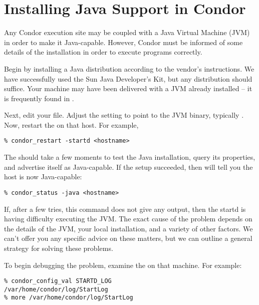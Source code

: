 \section{\label{sec:java-install}Installing Java Support in Condor}


Any Condor execution site may be coupled with a
Java Virtual Machine (JVM) in order to make it Java-capable.
However, Condor must be informed of some details of the
installation in order to execute programs correctly.

Begin by installing a Java distribution according to the vendor's
instructions.  We have successfully used the Sun Java Developer's
Kit, but any distribution should suffice.  Your machine may have
been delivered with a JVM already installed -- it is frequently
found in .

Next, edit your  file.  Adjust the 
setting to point to the JVM binary, typically .
Now, restart the  on that host.  For example,

\begin{verbatim}
% condor_restart -startd <hostname>
\end{verbatim}

The  should take a few moments to test the Java
installation, query its properties, and advertise itself as
Java-capable.  If the setup succeeded, then  will
tell you the host is now Java-capable:

\begin{verbatim}
% condor_status -java <hostname>
\end{verbatim}

If, after a few tries, this command does not give any output,
then the startd is having difficulty executing the JVM.
The exact cause of the problem depends on the details of the
JVM, your local installation, and a variety of other factors.
We can't offer you any specific advice on these matters, but
we can outline a general strategy for solving these problems.

To begin debugging the problem, examine the
 on that machine.  For example:

\begin{verbatim}
% condor_config_val STARTD_LOG
/var/home/condor/log/StartLog
% more /var/home/condor/log/StartLog
\end{verbatim}

